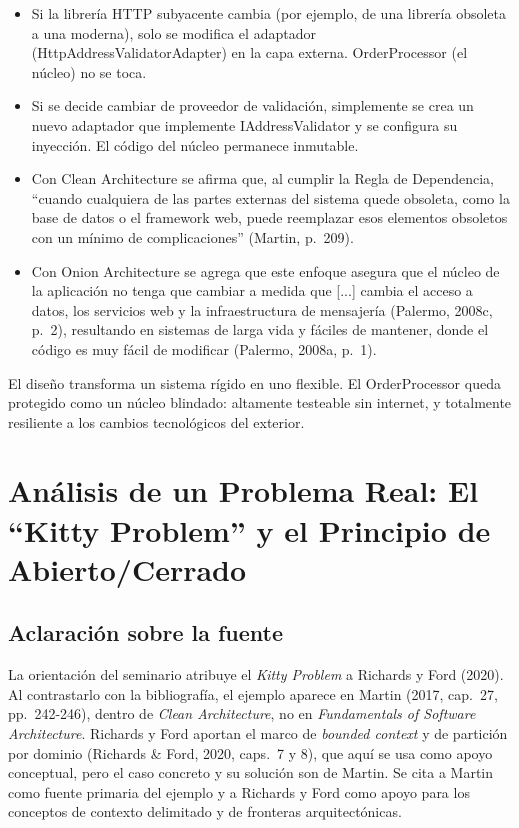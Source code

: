 \documentclass[12pt,a4paper]{article}
\begin{document}
\begin{itemize}[label=$\cdot$]
  \item Si la librería HTTP subyacente cambia (por ejemplo, de una librería obsoleta a una moderna), solo se modifica el adaptador (HttpAddressValidatorAdapter) en la capa externa. OrderProcessor (el núcleo) no se toca.
  \item Si se decide cambiar de proveedor de validación, simplemente se crea un nuevo adaptador que implemente IAddressValidator y se configura su inyección. El código del núcleo permanece inmutable.
  \item Con Clean Architecture se afirma que, al cumplir la Regla de Dependencia, ``cuando cualquiera de las partes externas del sistema quede obsoleta, como la base de datos o el framework web, puede reemplazar esos elementos obsoletos con un mínimo de complicaciones'' (Martin, p.~209).
  \item Con Onion Architecture se agrega que este enfoque asegura que el núcleo de la aplicación no tenga que cambiar a medida que [...] cambia el acceso a datos, los servicios web y la infraestructura de mensajería (Palermo, 2008c, p.~2), resultando en sistemas de larga vida y fáciles de mantener, donde el código es muy fácil de modificar (Palermo, 2008a, p.~1).
\end{itemize}

El diseño transforma un sistema rígido en uno flexible. El OrderProcessor queda protegido como un núcleo blindado: altamente testeable sin internet, y totalmente resiliente a los cambios tecnológicos del exterior.

\section{Análisis de un Problema Real: El ``Kitty Problem'' y el Principio de Abierto/Cerrado}

\subsection{Aclaración sobre la fuente}

La orientación del seminario atribuye el \emph{Kitty Problem} a Richards y Ford (2020). Al contrastarlo con la bibliografía, el ejemplo aparece en Martin (2017, cap.~27, pp.~242-246), dentro de \emph{Clean Architecture}, no en \emph{Fundamentals of Software Architecture}. Richards y Ford aportan el marco de \emph{bounded context} y de partición por dominio (Richards \& Ford, 2020, caps.~7 y 8), que aquí se usa como apoyo conceptual, pero el caso concreto y su solución son de Martin. Se cita a Martin como fuente primaria del ejemplo y a Richards y Ford como apoyo para los conceptos de contexto delimitado y de fronteras arquitectónicas.
\end{document}
